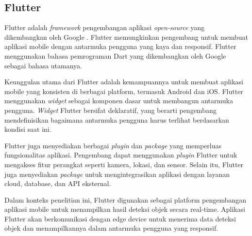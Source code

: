 \subsection{Flutter}

Flutter adalah \emph{framework} pengembangan aplikasi \emph{open-source} yang dikembangkan oleh Google \parencite*{google2024}. Flutter memungkinkan pengembang untuk membuat aplikasi mobile dengan antarmuka pengguna yang kaya dan responsif. Flutter menggunakan bahasa pemrograman Dart yang dikembangkan oleh Google sebagai bahasa utamanya.

Keunggulan utama dari Flutter adalah kemampuannya untuk membuat aplikasi mobile yang konsisten di berbagai platform, termasuk Android dan iOS. Flutter menggunakan \emph{widget} sebagai komponen dasar untuk membangun antarmuka pengguna. \emph{Widget} Flutter bersifat deklaratif, yang berarti pengembang mendefinisikan bagaimana antarmuka pengguna harus terlihat berdasarkan kondisi saat ini.

Flutter juga menyediakan berbagai \emph{plugin} dan \emph{package} yang memperluas fungsionalitas aplikasi. Pengembang dapat menggunakan \emph{plugin} Flutter untuk mengakses fitur perangkat seperti kamera, lokasi, dan sensor. Selain itu, Flutter juga menyediakan \emph{package} untuk mengintegrasikan aplikasi dengan layanan cloud, database, dan API eksternal.

Dalam konteks penelitian ini, Flutter digunakan sebagai platform pengembangan aplikasi mobile untuk menampilkan hasil deteksi objek secara real-time. Aplikasi Flutter akan berkomunikasi dengan edge device untuk menerima data deteksi objek dan menampilkannya dalam antarmuka pengguna yang responsif.


